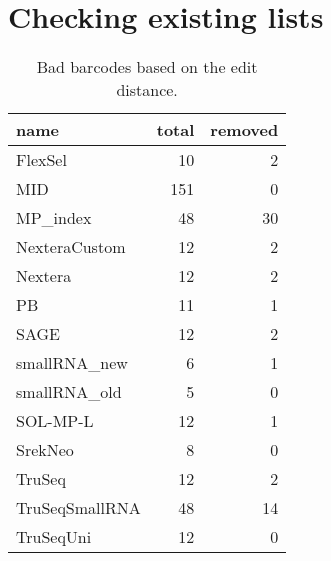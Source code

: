 \documentclass[slidestop]{beamer}
\begin{document}
\section{Checking existing lists}
\begin{frame}
  \begin{table}[]
    \begin{center}
      {\small
        \begin{tabular}{lrr}
          name            & total & removed\\
          \hline
          FlexSel         &  10   &  2\\
          MID             & 151   &  0\\
          MP\_index       &  48   & 30\\
          NexteraCustom   &  12   &  2\\
          Nextera         &  12   &  2\\
          PB              &  11   &  1\\
          SAGE            &  12   &  2\\
          smallRNA\_new   &   6   &  1\\
          smallRNA\_old   &   5   &  0\\
          SOL-MP-L        &  12   &  1\\
          SrekNeo         &   8   &  0\\
          TruSeq          &  12   &  2\\
          TruSeqSmallRNA  &  48   & 14\\
          TruSeqUni       &  12   &  0\\
        \end{tabular}
      }
    \end{center}
    \caption{Bad barcodes based on the edit distance.}
  \end{table}
\end{frame}
\end{document}
